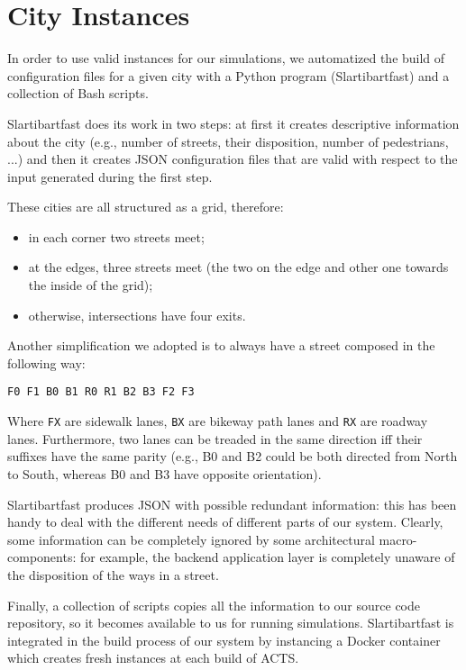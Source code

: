\section{City Instances}

In order to use valid instances for our simulations, we automatized the build
of configuration files for a given city with a Python program (Slartibartfast)
and a collection of Bash scripts.

Slartibartfast does its work in two steps: at first it creates
descriptive information about the city (e.g., number of streets, their
disposition, number of pedestrians, ...) and then it creates JSON configuration
files that are valid with respect to the input generated during the first step.

These cities are all structured as a grid, therefore:

\begin{itemize}
    \item in each corner two streets meet;
    \item at the edges, three streets meet (the two on the edge and other one
        towards the inside of the grid);
    \item otherwise, intersections have four exits.
\end{itemize}

Another simplification we adopted is to always have a street composed in the
following way:

\begin{verbatim}
F0 F1 B0 B1 R0 R1 B2 B3 F2 F3
\end{verbatim}

Where \texttt{FX} are sidewalk lanes, \texttt{BX} are bikeway path lanes and
\texttt{RX} are roadway lanes. Furthermore, two lanes can be treaded in the
same direction iff their suffixes have the same parity (e.g., B0 and B2
could be both directed from North to South, whereas B0 and B3 have opposite
orientation).

Slartibartfast produces JSON with possible redundant information: this has
been handy to deal with the different needs of different parts of our system.
Clearly, some information can be completely ignored by some architectural
macro-components: for example, the backend application layer is completely
unaware of the disposition of the ways in a street.

Finally, a collection of scripts copies all the information to our source code
repository, so it becomes available to us for running simulations.
Slartibartfast is integrated in the build process of our system by instancing
a Docker container which creates fresh instances at each build of ACTS.
